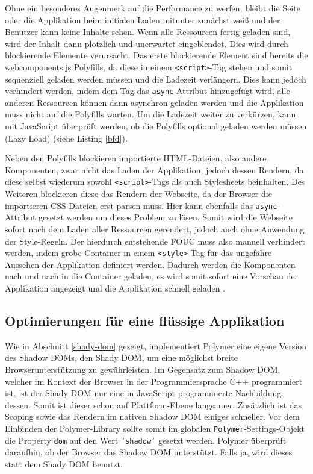 Ohne ein besonderes Augenmerk auf die Performance zu werfen, bleibt die Seite oder die Applikation beim initialen Laden mitunter zunächst weiß und der Benutzer kann keine Inhalte sehen. Wenn alle Ressourcen fertig geladen sind, wird der Inhalt dann plötzlich und unerwartet eingeblendet. Dies wird durch blockierende Elemente verursacht. Das erste blockierende Element sind bereits die webcomponents.js Polyfills, da diese in einem \texttt{\textless{}script\textgreater{}}-Tag stehen und somit sequenziell geladen werden müssen und die Ladezeit verlängern. Dies kann jedoch verhindert werden, indem dem Tag das \texttt{async}-Attribut hinzugefügt wird, alle anderen Ressourcen können dann asynchron geladen werden und die Applikation muss nicht auf die Polyfills warten. Um die Ladezeit weiter zu verkürzen, kann mit JavaScript überprüft werden, ob die Polyfills optional geladen werden müssen (Lazy Load) (siehe Listing \ref{bfd}).



Neben den Polyfills blockieren importierte \ac{HTML}-Dateien, also andere Komponenten, zwar nicht das Laden der Applikation, jedoch dessen Rendern, da diese selbst wiederum sowohl \texttt{\textless{}script\textgreater{}}-Tags als auch Stylesheets beinhalten. Des Weiteren blockieren diese das Rendern der Webseite, da der Browser die importieren \ac{CSS}-Dateien erst parsen muss. Hier kann ebenfalls das \texttt{async}-Attribut gesetzt werden um dieses Problem zu lösen. Somit wird die Webseite sofort nach dem Laden aller Ressourcen gerendert, jedoch auch ohne Anwendung der Style-Regeln. Der hierdurch entstehende \ac{FOUC} muss also manuell verhindert werden, indem grobe Container in einem \texttt{\textless{}style\textgreater{}}-Tag für das ungefähre Aussehen der Applikation definiert werden. Dadurch werden die Komponenten nach und nach in die Container geladen, es wird somit sofort eine Vorschau der Applikation angezeigt und die Applikation schnell geladen \cite{citeulike:13915203}.


\subsection{Optimierungen für eine flüssige Applikation}\label{optimierungen-fuxfcr-eine-fluxfcssige-applikation}

Wie in Abschnitt \ref{shady-dom} gezeigt, implementiert Polymer eine eigene Version des Shadow \ac{DOM}s, den Shady \ac{DOM}, um eine möglichst breite Browserunterstützung zu gewährleisten. Im Gegensatz zum Shadow \ac{DOM}, welcher im Kontext der Browser in der Programmiersprache C++ programmiert ist, ist der Shady \ac{DOM} nur eine in JavaScript programmierte Nachbildung dessen. Somit ist dieser schon auf Plattform-Ebene langsamer. Zusätzlich ist das Scoping sowie das Rendern im nativen Shadow \ac{DOM} einiges schneller. Vor dem Einbinden der Polymer-Library sollte somit im globalen \texttt{Polymer}-Settings-Objekt die Property \texttt{dom} auf den Wert \texttt{'shadow'} gesetzt werden. Polymer überprüft daraufhin, ob der Browser das Shadow \ac{DOM} unterstützt. Falls ja, wird dieses statt dem Shady DOM benutzt.

